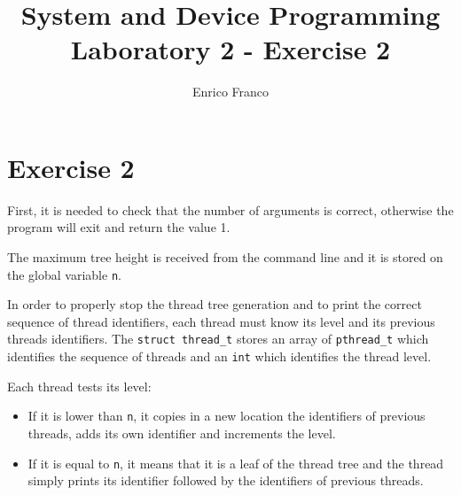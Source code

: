 \documentclass{report}
\author{Enrico Franco}
\title{System and Device Programming \\
	Laboratory 2 - Exercise 2}
\begin{document}
\section*{Exercise 2}
First, it is needed to check that the number of arguments is correct, otherwise the program will exit and return the value 1.

The maximum tree height is received from the command line and it is stored on the global variable \texttt{n}.

In order to properly stop the thread tree generation and to print the correct sequence of thread identifiers, each thread must know its level and its previous threads identifiers. The \texttt{struct thread\_t} stores an array of \texttt{pthread\_t} which identifies the sequence of threads and an \texttt{int} which identifies the thread level.

Each thread tests its level:
\begin{itemize}
\item If it is lower than \texttt{n}, it copies in a new location the identifiers of previous threads, adds its own identifier and increments the level.
\item If it is equal to \texttt{n}, it means that it is a leaf of the thread tree and the thread simply prints its identifier followed by the identifiers of previous threads.
\end{itemize}
\end{document}

